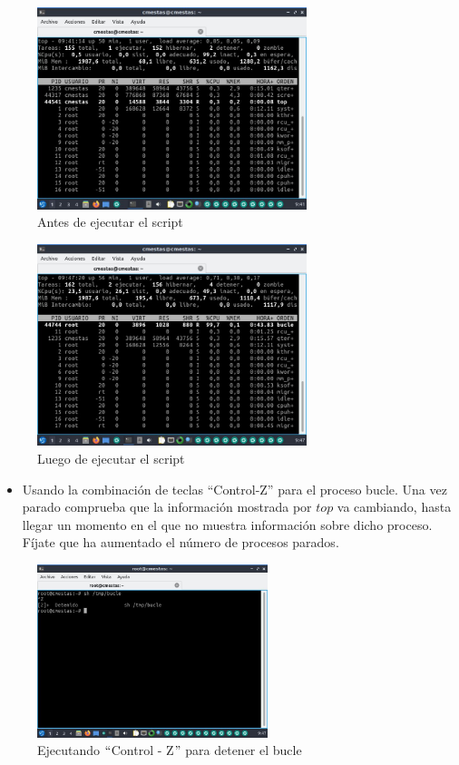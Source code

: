 \documentclass[12pt]{article}
\begin{document}
\begin{figure}[h]
    \centering
    \includegraphics[width=0.7\textwidth]{images/screenA09.jpg}
    \caption{Antes de ejecutar el script}
\end{figure}

\clearpage
\newpage

\begin{figure}[h]
    \centering
    \includegraphics[width=0.7\textwidth]{images/screenA10.jpg}
    \caption{Luego de ejecutar el script}
\end{figure}

\begin{itemize}
    \item Usando la combinación de teclas “Control-Z” para el proceso bucle. Una vez parado comprueba que la información mostrada por $top$ va cambiando, hasta llegar un momento en el que no muestra información sobre dicho proceso. Fíjate que ha aumentado el número de procesos parados.
\end{itemize}

\begin{figure}[h]
    \centering
    \includegraphics[width=0.6\textwidth]{images/screenA11.jpg}
    \caption{Ejecutando $``$Control - Z$"$ para detener el bucle}
\end{figure} 
\end{document}
